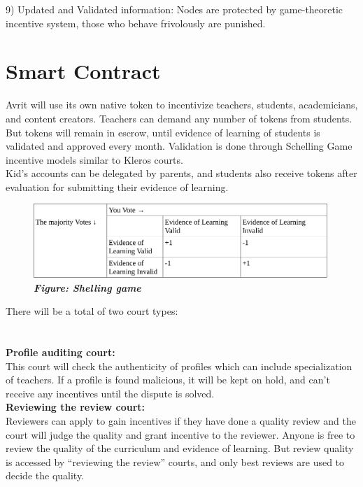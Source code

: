 \documentclass[a4paper,12pt,twoside]{extarticle}
\begin{document}
\begin{adjustwidth}{11em}{}
9) Updated and Validated information: Nodes are protected by game-theoretic incentive system, those who behave frivolously are punished.
\section*{Smart Contract}

Avrit will use its own native token to incentivize teachers, students, academicians, and content creators. Teachers can demand any number of tokens from students. But tokens will remain in escrow, until evidence of learning of students is validated and approved every month. Validation is done through Schelling Game incentive models similar to Kleros courts. \\ 
Kid's accounts can be delegated by parents, and students also receive tokens after evaluation for submitting their evidence of learning. 

\begin{figure}[h]\begin{adjustwidth}{11em}{}\includegraphics[width=30em]{shelling_game_avrit.pdf}\begin{mdframed}[style=captionstyle]\caption*{  \scriptsize \textit{\textbf{Figure: Shelling game }}}\end{mdframed}\end{adjustwidth}\end{figure}


There will be a total of two court types: \\
 \\  \\ 
\textbf{Profile auditing court:}  \\
This court will check the authenticity of profiles which can include specialization of teachers. If a profile is found malicious, it will be kept on hold, and can't receive any incentives until the dispute is solved. 
\\  \textbf{Reviewing the review court:} \\
Reviewers can apply to gain incentives if they have done a quality review and the court will judge the quality and grant incentive to the reviewer. Anyone is free to review the quality of the curriculum and evidence of learning. But review quality is accessed by “reviewing the review” courts, and only best reviews are used to decide the quality. 




\end{adjustwidth}
\end{document}
